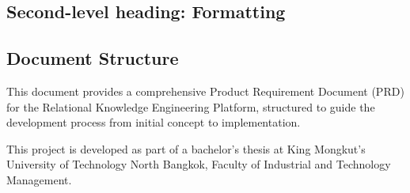 \documentclass[%
 reprint,
 amsmath,amssymb,
 aps,
]{revtex4-2}
\begin{document}
\subsection{\label{sec:level2}Second-level heading: Formatting}

\subsection{\label{sec:document_structure}Document Structure}

This document provides a comprehensive Product Requirement Document (PRD) for the Relational Knowledge Engineering Platform, structured to guide the development process from initial concept to implementation.

\begin{acknowledgments}
This project is developed as part of a bachelor's thesis at King Mongkut's University of Technology North Bangkok, Faculty of Industrial and Technology Management.
\end{acknowledgments}

\end{document}
